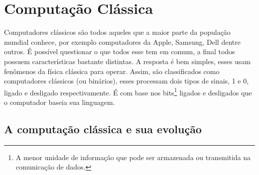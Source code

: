 \section{Computação Clássica} 
Computadores clássicos são todos aqueles que a maior parte da população mundial conhece, por exemplo computadores da Apple, Samsung, Dell dentre outros. É possível questionar o que todos esse tem em comum, a final todos possuem características bastante distintas. A resposta é bem simples, esses usam fenômenos da física clássica para operar. Assim, são classificados como computadores clássicos (ou binários), esses processam dois tipos de sinais, 1 e 0, ligado e desligado respectivamente. É com base nos \label{bits}bits\footnote{A menor unidade de informação que pode ser armazenada ou transmitida na comunicação de dados.} ligados e desligados que o computador baseia sua linguagem.\par

\subsection{A computação clássica e sua evolução}
\newpage
